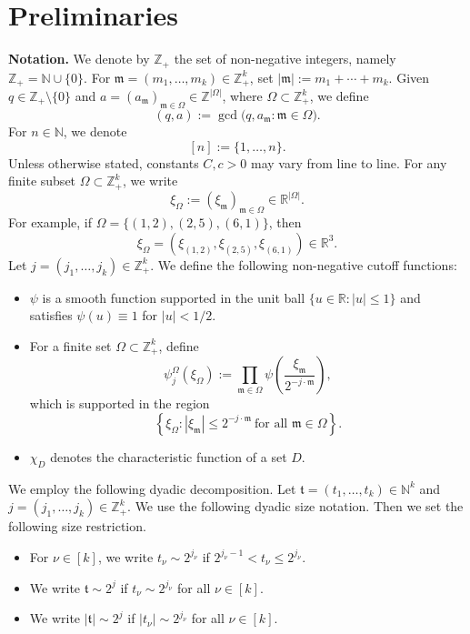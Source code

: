 \documentclass[11 pt,letterpaper]{amsart}
\theoremstyle{plain}
\theoremstyle{definition}
\theoremstyle{remark} \theoremstyle{exam} \theoremstyle{ob}
\numberwithin{equation}{section}
\begin{document}
  \section{Preliminaries}\label{sec2}
  \noindent
{\bf Notation.} 
We denote by $\mathbb{Z}_+$ the set of non-negative integers, namely
$\mathbb{Z}_+ = \mathbb{N} \cup \{0\}.$
For $\mathfrak{m}=(m_1,\ldots,m_k)\in\mathbb{Z}_+^k$, set $ |\mathfrak{m}|:=m_1+\cdots+m_k.$ Given $q \in \mathbb{Z}_+ \setminus \{0\}$ and
$a = (a_{\mathfrak m})_{\mathfrak m \in \Omega} \in \mathbb{Z}^{|\Omega|}$,
where $\Omega \subset \mathbb{Z}_+^{k}$, we define
\[
(q,a) := \gcd\bigl(q, a_{\mathfrak m} : \mathfrak m \in \Omega\bigr).
\]
For $n \in \mathbb{N}$, we denote $$[n] := \{1,\dots,n\}.$$
Unless otherwise stated, constants $C,c>0$ may vary from line to line.
For any finite subset $\Omega \subset \mathbb{Z}_+^{k}$,
we write
\begin{equation*}
\xi_{\Omega} := (\xi_{\mathfrak m})_{\mathfrak m \in \Omega}
\in \mathbb{R}^{|\Omega|}.
\end{equation*}
For example, if $\Omega = \{(1,2),(2,5),(6,1)\}$, then
\[
\xi_{\Omega}
= (\xi_{(1,2)}, \xi_{(2,5)}, \xi_{(6,1)}) \in \mathbb{R}^{3}.
\]
 Let $j = (j_1,\dots,j_k) \in \mathbb{Z}_+^{k}$.
We  define the following non-negative cutoff functions:
\begin{itemize}
\item[(1)] $\psi$ is a smooth function supported in the unit ball
$\{u \in \mathbb{R} : |u| \le 1\}$ and satisfies
$\psi(u) \equiv 1$ for $|u| < 1/2$.
\item[(2)] For a finite set $\Omega \subset \mathbb{Z}_+^{k}$, define
\[
\psi^{\Omega}_{j}(\xi_\Omega)
:= \prod_{\mathfrak m \in \Omega}
\psi\!\left( \frac{\xi_{\mathfrak m}}{2^{-j \cdot \mathfrak m}} \right),
\]
which is supported in the region
\[
\left\{
\xi_{\Omega} : |\xi_{\mathfrak m}| \le 2^{-j \cdot \mathfrak m}
\ \text{for all } \mathfrak m \in \Omega
\right\}.
\]
\item[(3)] $\chi_D$ denotes the characteristic function of a set
$D$.
\end{itemize}
We employ the following dyadic decomposition.
Let $\mathfrak{t}=(t_1,\ldots,t_k)\in\mathbb {N}^k$ and
$j=(j_1,\ldots,j_k)\in\mathbb Z_+^k$.
We use the following dyadic size notation. Then we set the following size restriction.
\begin{itemize}
\item For $\nu \in [k]$, we write $t_\nu \sim 2^{j_\nu}$ if
$2^{j_\nu-1} < t_\nu \le 2^{j_\nu}$.
\item We write $\mathfrak t \sim 2^{j}$ if
$t_\nu \sim 2^{j_\nu}$ for all $\nu \in [k]$.
\item We write $|\mathfrak t| \sim 2^{j}$ if
$|t_\nu| \sim 2^{j_\nu}$ for all $\nu \in [k]$.
\end{itemize}
\end{document}
